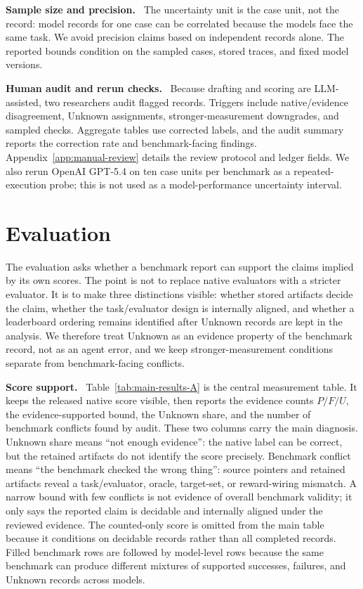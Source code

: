 \documentclass{article}
\newcommand{\unknownLabel}{Unknown\xspace}
\newcommand{\runin}[1]{\noindent\textbf{#1}\ }
\begin{document}
\runin{Sample size and precision.}
The uncertainty unit is the case unit, not the record: model records for one
case can be correlated because the models face the same task. We avoid
precision claims based on independent records alone. The reported bounds
condition on the sampled cases, stored traces, and fixed model versions.

\runin{Human audit and rerun checks.}
\label{sec:audit}
Because drafting and scoring are LLM-assisted, two researchers audit
flagged records. Triggers include native/evidence
disagreement, \unknownLabel assignments, stronger-measurement downgrades, and
sampled checks. Aggregate tables use corrected labels, and the audit summary
reports the correction rate and benchmark-facing findings.
Appendix~\ref{app:manual-review} details the review protocol and
ledger fields. We also rerun OpenAI GPT-5.4 on ten case units per benchmark as
a repeated-execution probe; this is not used as a model-performance
uncertainty interval.

\section{Evaluation}
\label{sec:main-results}
\label{sec:evaluation}

The evaluation asks whether a benchmark report can support the claims implied
by its own scores. The point is not to replace native evaluators with a stricter
evaluator. It is to make three distinctions visible: whether stored artifacts
decide the claim, whether the task/evaluator design is internally aligned, and
whether a leaderboard ordering remains identified after Unknown records are
kept in the analysis. We therefore treat Unknown as an evidence property of the
benchmark record, not as an agent error, and we keep stronger-measurement
conditions separate from benchmark-facing conflicts.

\runin{Score support.}
Table~\ref{tab:main-results-A} is the central measurement table. It keeps the
released native score visible, then reports the evidence counts \(P/F/U\), the
evidence-supported bound, the Unknown share, and the number of benchmark
conflicts found by audit. These two columns carry the main diagnosis. Unknown
share means ``not enough evidence'': the native label can be correct, but the
retained artifacts do not identify the score precisely. Benchmark conflict
means ``the benchmark checked the wrong thing'': source pointers and retained
artifacts reveal a task/evaluator, oracle, target-set, or reward-wiring
mismatch. A narrow bound with few conflicts is not evidence of overall
benchmark validity; it only says the reported claim is decidable and internally
aligned under the reviewed evidence.
The counted-only score is omitted from the main table because it conditions on
decidable records rather than all completed records. Filled benchmark rows are
followed by model-level rows because the same benchmark can produce different
mixtures of supported successes, failures, and Unknown records across models.
\end{document}
